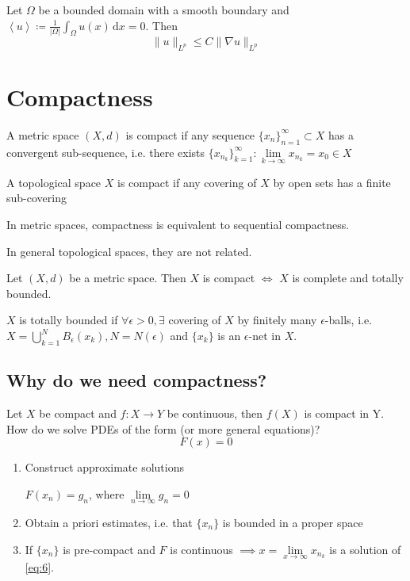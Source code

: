 \documentclass{report}
\begin{document}
{
    Let \(\Omega\) be a bounded domain with a smooth boundary and \(\left\langle u \right\rangle \coloneqq \frac{1}{\vert \Omega \vert } \int_{\Omega} u(x) \,\mathrm{d}x = 0\). Then 
    \[
        \|u\|_{L^{p}} \leq C \|\nabla u\|_{L^{p}}
    \]   
}

\section{Compactness}
{
    A metric space \((X, d)\) is compact if any sequence \(\{x_{n}\}_{n=1}^{\infty} \subset X\) has a convergent sub-sequence, i.e. there exists \(\{x_{n_{k}}\}_{k=1}^{\infty} \colon \lim\limits_{k \to \infty} x_{n_{k}} = x_0 \in X\)
}

\dfn{}
{
    A topological space \(X\) is compact if any covering of \(X\) by open sets has a finite sub-covering
}

\begin{note}
    In metric spaces, compactness is equivalent to sequential compactness.

    In general topological spaces, they are not related.
\end{note}

{
    Let \((X, d)\) be a metric space. Then \(X\) is compact \(\iff\) \(X\) is complete and totally bounded.
}

\dfn{}
{
    \(X\) is totally bounded if \(\forall \epsilon > 0, \exists\) covering of \(X\) by finitely many \(\epsilon\)-balls, i.e. \(X = \bigcup_{k=1}^{N} B_{\epsilon}(x_k), N = N(\epsilon)\) and \(\{x_k\}\) is an \(\epsilon\)-net in \(X\).
}

\subsection*{Why do we need compactness?}
Let \(X\) be compact and \(f \colon X \to Y \) be continuous, then \(f(X)\) is compact in Y. How do we solve PDEs of the form (or more general equations)?
\begin{equation}\label{eq:6}
    F(x) = 0
\end{equation}
\begin{enumerate}
    \item Construct approximate solutions
    
    \(F(x_n) = g_n\), where \(\lim\limits_{n \to \infty} g_n = 0\)
    \item Obtain a priori estimates, i.e. that \(\{x_n\}\) is bounded in a proper space
    \item If \(\{x_n\}\) is pre-compact and \(F\) is continuous \(\implies x = \lim\limits_{x \to \infty} x_{n_{k}}\) is a solution of \ref{eq:6}.
\end{enumerate}
\end{document}
